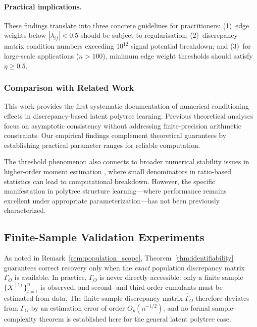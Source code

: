 \documentclass[11pt,a4paper]{article}
\numberwithin{equation}{section}
\begin{document}
\paragraph{Practical implications.}
These findings translate into three concrete guidelines for practitioners:
(1)~edge weights below $|\lambda_{ij}|<0.5$ should be subject to regularisation;
(2)~discrepancy matrix condition numbers exceeding $10^{12}$ signal potential
breakdown; and (3)~for large-scale applications ($n>100$), minimum edge weight
thresholds should satisfy $\eta\geq0.5$.

\subsubsection{Comparison with Related Work}

This work provides the first systematic documentation of numerical conditioning effects in discrepancy-based latent polytree learning. Previous theoretical analyses \citep{etesami:kiyavash:coleman:2016} focus on asymptotic consistency without addressing finite-precision arithmetic constraints. Our empirical findings complement theoretical guarantees by establishing practical parameter ranges for reliable computation.

The threshold phenomenon also connects to broader numerical stability issues in higher-order moment estimation \citep{comon:jutten:handbook}, where small denominators in ratio-based statistics can lead to computational breakdown. However, the specific manifestation in polytree structure learning—where performance remains excellent under appropriate parameterization—has not been previously characterized.

\subsection{Finite-Sample Validation Experiments}
\label{subsec:finite_sample}

As noted in Remark~\ref{rem:population_scope}, Theorem~\ref{thm:identifiability}
guarantees correct recovery only when the \emph{exact} population discrepancy
matrix $\Gamma_O$ is available.  In practice, $\Gamma_O$ is never directly
accessible: only a finite sample $\{X^{(t)}\}_{t=1}^{n}$ is observed, and
second- and third-order cumulants must be estimated from data.  The
finite-sample discrepancy matrix $\hat\Gamma_O$ therefore deviates from
$\Gamma_O$ by an estimation error of order $O_p(n^{-1/2})$, and no formal
sample-complexity theorem is established here for the general latent polytree
case.
\end{document}
